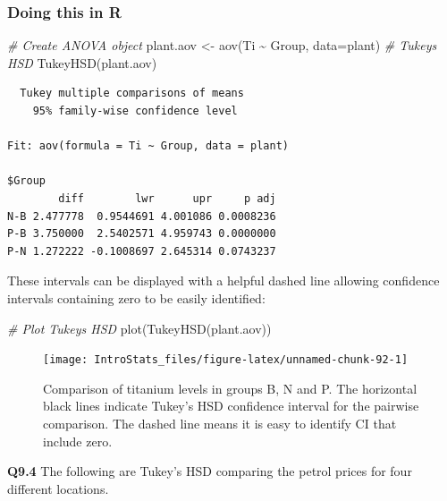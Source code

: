 \documentclass[
  oneside]{krantz}
\newenvironment{Shaded}{\begin{snugshade}}{\end{snugshade}}
\newcommand{\AttributeTok}[1]{\textcolor[rgb]{0.77,0.63,0.00}{#1}}
\newcommand{\CommentTok}[1]{\textcolor[rgb]{0.56,0.35,0.01}{\textit{#1}}}
\newcommand{\FunctionTok}[1]{\textcolor[rgb]{0.00,0.00,0.00}{#1}}
\newcommand{\NormalTok}[1]{#1}
\newcommand{\OtherTok}[1]{\textcolor[rgb]{0.56,0.35,0.01}{#1}}
\newcommand{\SpecialCharTok}[1]{\textcolor[rgb]{0.00,0.00,0.00}{#1}}
\begin{document}
\hypertarget{doing-this-in-r-17}{%
\subsubsection{Doing this in R}\label{doing-this-in-r-17}}

\begin{Shaded}
\begin{Highlighting}[]
\CommentTok{\# Create ANOVA object}
\NormalTok{plant.aov }\OtherTok{\textless{}{-}} \FunctionTok{aov}\NormalTok{(Ti }\SpecialCharTok{\textasciitilde{}}\NormalTok{ Group, }\AttributeTok{data=}\NormalTok{plant)}
\CommentTok{\# Tukeys HSD}
\FunctionTok{TukeyHSD}\NormalTok{(plant.aov)}
\end{Highlighting}
\end{Shaded}

\begin{verbatim}
  Tukey multiple comparisons of means
    95% family-wise confidence level

Fit: aov(formula = Ti ~ Group, data = plant)

$Group
        diff        lwr      upr     p adj
N-B 2.477778  0.9544691 4.001086 0.0008236
P-B 3.750000  2.5402571 4.959743 0.0000000
P-N 1.272222 -0.1008697 2.645314 0.0743237
\end{verbatim}

These intervals can be displayed with a helpful dashed line allowing confidence intervals containing zero to be easily identified:

\begin{Shaded}
\begin{Highlighting}[]
\CommentTok{\# Plot Tukeys HSD}
\FunctionTok{plot}\NormalTok{(}\FunctionTok{TukeyHSD}\NormalTok{(plant.aov))}
\end{Highlighting}
\end{Shaded}

\begin{figure}

{\centering \texttt{[image: IntroStats\_files/figure-latex/unnamed-chunk-92-1]} 

}

\caption{Comparison of titanium levels in groups B, N and P. The horizontal black lines indicate Tukey's HSD confidence interval for the pairwise comparison. The dashed line means it is easy to identify CI that include zero.}\label{fig:unnamed-chunk-92}
\end{figure}

\textbf{Q9.4} The following are Tukey's HSD comparing the petrol prices for four different locations.
\end{document}
